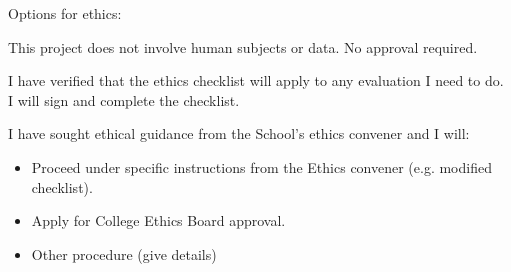 \documentclass[11pt]{article}
\begin{document}
Options for ethics:

\item This project does not involve human subjects or data. No approval required.
\item I have verified that the ethics checklist will apply to any evaluation I need to do. I will sign and complete the checklist.
\item I have sought ethical guidance from the School's ethics convener and I will:
\begin{itemize}
    \item Proceed under specific instructions from the Ethics convener (e.g. modified checklist).
    \item Apply for College Ethics Board approval.
    \item Other procedure (give details)
\end{itemize}   
\end{document}
